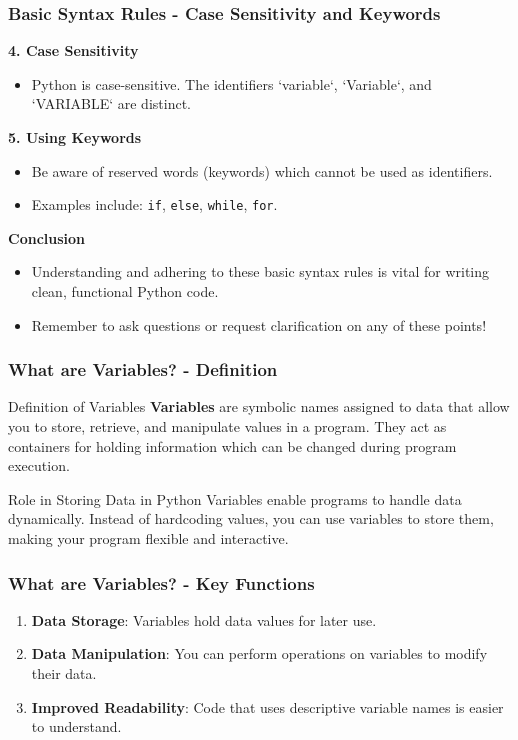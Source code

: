 \documentclass{beamer}
\begin{document}
\begin{frame}[fragile]
    \frametitle{Basic Syntax Rules - Case Sensitivity and Keywords}
    \textbf{4. Case Sensitivity}
    \begin{itemize}
        \item Python is case-sensitive. The identifiers `variable`, `Variable`, and `VARIABLE` are distinct.
    \end{itemize}

    \textbf{5. Using Keywords}
    \begin{itemize}
        \item Be aware of reserved words (keywords) which cannot be used as identifiers.
        \item Examples include: \texttt{if}, \texttt{else}, \texttt{while}, \texttt{for}.
    \end{itemize}

    \textbf{Conclusion}
    \begin{itemize}
        \item Understanding and adhering to these basic syntax rules is vital for writing clean, functional Python code.
        \item Remember to ask questions or request clarification on any of these points!
    \end{itemize}
\end{frame}

\begin{frame}[fragile]
    \frametitle{What are Variables? - Definition}
    \begin{block}{Definition of Variables}
        \textbf{Variables} are symbolic names assigned to data that allow you to store, retrieve, and manipulate values in a program. 
        They act as containers for holding information which can be changed during program execution.
    \end{block}
    
    \begin{block}{Role in Storing Data in Python}
        Variables enable programs to handle data dynamically. Instead of hardcoding values, you can use variables to store them, making your program flexible and interactive.
    \end{block}
\end{frame}

\begin{frame}[fragile]
    \frametitle{What are Variables? - Key Functions}
    \begin{enumerate}
        \item \textbf{Data Storage}: Variables hold data values for later use.
        \item \textbf{Data Manipulation}: You can perform operations on variables to modify their data.
        \item \textbf{Improved Readability}: Code that uses descriptive variable names is easier to understand.
    \end{enumerate}
\end{frame}
\end{document}
